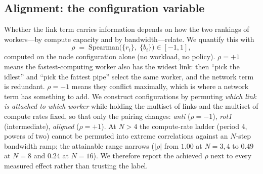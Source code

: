 \subsection{Alignment: the configuration variable}
\label{sec:alignment}
Whether the link term carries information depends on how the two rankings of workers---by compute
capacity and by bandwidth---relate. We quantify this with
\begin{equation}
  \rho \;=\; \mathrm{Spearman}\big(\{r_i\},\; \{b_i\}\big) \in [-1, 1],
  \label{eq:alignment}
\end{equation}
computed on the node configuration alone (no workload, no policy). $\rho=+1$ means the
fastest-computing worker also has the widest link: then ``pick the idlest'' and ``pick the
fattest pipe'' select the same worker, and the network term is redundant. $\rho=-1$ means they
conflict maximally, which is where a network term has something to add. We construct
configurations by permuting \emph{which link is attached to which worker} while holding the
multiset of links and the multiset of compute rates fixed, so that only the pairing changes:
\emph{anti} ($\rho=-1$), \emph{rot1} (intermediate), \emph{aligned} ($\rho=+1$). At $N>4$ the
compute-rate ladder (period 4, powers of two) cannot be permuted into extreme correlations
against an $N$-step bandwidth ramp; the attainable range narrows ($|\rho|$ from $1.00$ at
$N{=}3,4$ to $0.49$ at $N{=}8$ and $0.24$ at $N{=}16$). We therefore report the achieved $\rho$
next to every measured effect rather than trusting the label.

